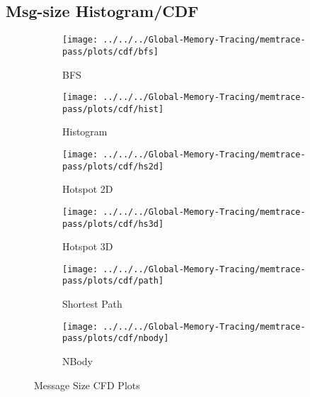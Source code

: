 \subsection{Msg-size Histogram/CDF}
\begin{figure}
	\begin{subfigure}[b]{0.45\textwidth}
		\texttt{[image: ../../../Global-Memory-Tracing/memtrace-pass/plots/cdf/bfs]}
		\caption{BFS}
		\label{fig:cfd-bfs}
	\end{subfigure}
	\begin{subfigure}[b]{0.45\textwidth}
		\texttt{[image: ../../../Global-Memory-Tracing/memtrace-pass/plots/cdf/hist]}
		\caption{Histogram}
		\label{fig:density-hist}
	\end{subfigure}
	\begin{subfigure}[b]{0.45\textwidth}
		\texttt{[image: ../../../Global-Memory-Tracing/memtrace-pass/plots/cdf/hs2d]}
		\caption{Hotspot 2D}
		\label{fig:cfd-hs2d}
	\end{subfigure}
	\begin{subfigure}[b]{0.45\textwidth}
		\texttt{[image: ../../../Global-Memory-Tracing/memtrace-pass/plots/cdf/hs3d]}
		\caption{Hotspot 3D}
		\label{fig:cfd-hs3d}
	\end{subfigure}
	\begin{subfigure}[b]{0.45\textwidth}
		\texttt{[image: ../../../Global-Memory-Tracing/memtrace-pass/plots/cdf/path]}
		\caption{Shortest Path}
		\label{fig:cfd-path}
	\end{subfigure}
	\hfill
	\begin{subfigure}[b]{0.45\textwidth}
		\texttt{[image: ../../../Global-Memory-Tracing/memtrace-pass/plots/cdf/nbody]}
		\caption{NBody}
		\label{fig:cfd-nbody}
	\end{subfigure}
	\caption{Message Size CFD Plots}
	\label{fig:CDF}
\end{figure}
